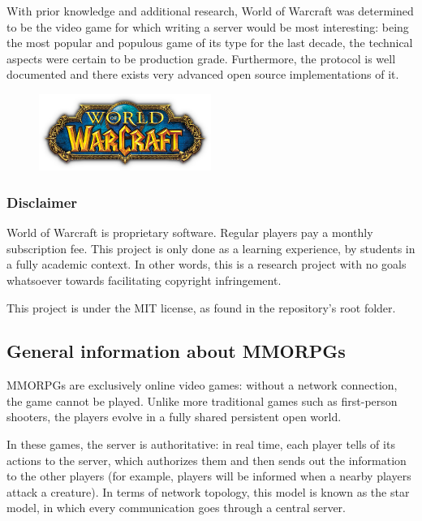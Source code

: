 \documentclass[paper=a4, fontsize=11pt]{scrartcl}
\begin{document}
With prior knowledge and additional research, World of Warcraft was determined
to be the video game for which writing a server would be most interesting: being
the most popular and populous game of its type for the last decade, the
technical aspects were certain to be production grade.
Furthermore, the protocol is well documented and there exists very advanced open
source implementations of it.

\begin{figure}[htb!]
    \centering
    \includegraphics[width=0.5\textwidth]{wow}
\end{figure}

\FloatBarrier{}

\subsubsection{Disclaimer}

World of Warcraft is proprietary software.
Regular players pay a monthly subscription fee.
This project is only done as a learning experience, by students in a fully
academic context.
In other words, this is a research project with no goals whatsoever towards
facilitating copyright infringement.

This project is under the MIT license, as found in the repository's root folder.

\subsection{General information about MMORPGs}

MMORPGs are exclusively online video games: without a network connection, the
game cannot be played. Unlike more traditional games such as first-person
shooters, the players evolve in a fully shared persistent open world.

In these games, the server is authoritative: in real time, each player tells of
its actions to the server, which authorizes them and then sends out the
information to the other players (for example, players will be informed when a
nearby players attack a creature).
In terms of network topology, this model is known as the star model, in which
every communication goes through a central server.
\end{document}

